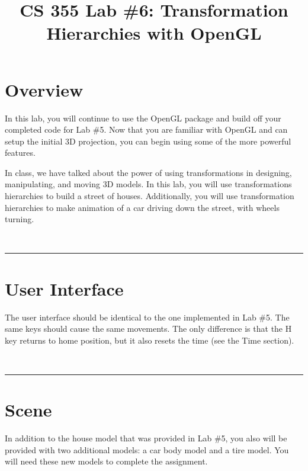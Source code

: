 \documentclass[11pt]{article}
\title{\vspace{-0.5in}CS 355 Lab \#6: Transformation Hierarchies with OpenGL}
\date{\vspace{-0.25in}}
\newif\ifinstructor
\begin{document}
\maketitle

\newcommand{\mat}[1]{\mathbf #1}
\renewcommand{\vec}[1]{\mathbf #1}
\newcommand{\x}{\vec{x}}
\newcommand{\y}{\vec{y}}
\newcommand{\p}{\vec{p}}
\renewcommand{\c}{\vec{c}}

\newcommand{\note}[1]{\textcolor{red}{NOTE: #1}}
\newcommand{\divider}{\bigskip ~ \hrule}

\vspace{-0.5in}

\ifinstructor
Time to complete: 1 week ramp-up plus 1 week to actually do.
\fi

\section*{Overview}

In this lab, you will continue to use the OpenGL package and build off your completed code for Lab \#5. Now that you are familiar with OpenGL and can setup the initial 3D projection, you can begin using some of the more powerful features.

In class, we have talked about the power of using transformations in designing, manipulating, and moving 3D models. In this lab, you will use transformations hierarchies to build a street of houses. Additionally, you will use transformation hierarchies to make animation of a car driving down the street, with wheels turning.

\divider

\section*{User Interface}

The user interface should be identical to the one implemented in Lab \#5. The same keys should cause the same movements. The only difference is that the H key returns to home position, but it also resets the time (see the Time section).

\divider

\section*{Scene}

In addition to the house model that was provided in Lab \#5, you also will be provided with two additional models: a car body model and a tire model. You will need these new models to complete the assignment.
\end{document}
